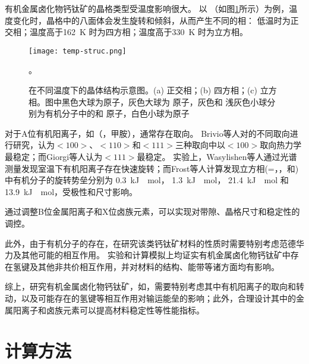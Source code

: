 有机金属卤化物钙钛矿的晶格类型受温度影响很大。
以 （如图\ref{fig:temp-struc}所示）为例，温度变化时，晶格中的八面体会发生旋转和倾斜，从而产生不同的相：
低温时为正交相；温度高于\SI{162}{K} 时为四方相；温度高于\SI{330}{K} 时为立方相。

\begin{figure}[htbp]
    \centering
    \texttt{[image: temp-struc.png]}
    \caption{在不同温度下的晶体结构示意图。(a) 正交相；(b) 四方相；(c) 立方相。图中黑色大球为原子，灰色大球为  原子，灰色和 浅灰色小球分别为有机分子中的和 原子，白色小球为原子}。
    \label{fig:temp-struc}
\end{figure}

对于A位有机阳离子，如（，甲胺），通常存在取向。
Brivio等人对的不同取向进行研究，认为$<100>$、$<110>$和$<111>$三种取向中以$<100>$取向热力学最稳定；而Giorgi等人认为$<111>$最稳定。
实验上，Wasylishen等人通过光谱测量发现室温下有机阳离子存在快速旋转；而Frost等人计算发现立方相(=，，和)中有机分子的旋转势垒分别为 \SI{0.3}{kJ \per \mole}， \SI{1.3}{kJ \per \mole}，  \SI{21.4}{kJ \per\mole} 和 \SI{13.9}{kJ \per \mole}，受极性和尺寸影响。

通过调整B位金属阳离子和X位卤族元素，可以实现对带隙、晶格尺寸和稳定性的调控。

此外，由于有机分子的存在，在研究该类钙钛矿材料的性质时需要特别考虑范德华力及其他可能的相互作用。
实验和计算模拟上均证实有机金属卤化物钙钛矿中存在氢键及其他非共价相互作用，并对材料的结构、能带等诸方面均有影响。

综上，研究有机金属卤化物钙钛矿，如，需要特别考虑其中有机阳离子的取向和转动，以及可能存在的氢键等相互作用对输运能垒的影响；此外，合理设计其中的金属阳离子和卤族元素可以提高材料稳定性等性能指标。

\section{计算方法}

